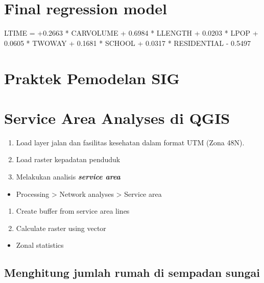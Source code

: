 \documentclass[]{book}
\providecommand{\tightlist}{%
  \setlength{\itemsep}{0pt}\setlength{\parskip}{0pt}}
\begin{document}
\hypertarget{final-regression-model}{%
\section{Final regression model}\label{final-regression-model}}

LTIME = +0.2663 * CARVOLUME + 0.6984 * LLENGTH + 0.0203 * LPOP + 0.0605 * TWOWAY + 0.1681 * SCHOOL + 0.0317 * RESIDENTIAL - 0.5497

\hypertarget{praktek-pemodelan-sig}{%
\section{Praktek Pemodelan SIG}\label{praktek-pemodelan-sig}}

\hypertarget{service-area-analyses-di-qgis}{%
\section{Service Area Analyses di QGIS}\label{service-area-analyses-di-qgis}}

\begin{enumerate}
\def\labelenumi{\arabic{enumi}.}
\item
  Load layer jalan dan fasilitas kesehatan dalam format UTM (Zona 48N).
\item
  Load raster kepadatan penduduk
\item
  Melakukan analisis \textbf{\emph{service area}}
\end{enumerate}

\begin{itemize}
\tightlist
\item
  Processing \textgreater{} Network analyses \textgreater{} Service area
\end{itemize}

\begin{enumerate}
\def\labelenumi{\arabic{enumi}.}
\setcounter{enumi}{3}
\item
  Create buffer from service area lines
\item
  Calculate raster using vector
\end{enumerate}

\begin{itemize}
\tightlist
\item
  Zonal statistics
\end{itemize}

\hypertarget{menghitung-jumlah-rumah-di-sempadan-sungai}{%
\subsection{Menghitung jumlah rumah di sempadan sungai}\label{menghitung-jumlah-rumah-di-sempadan-sungai}}
\end{document}
